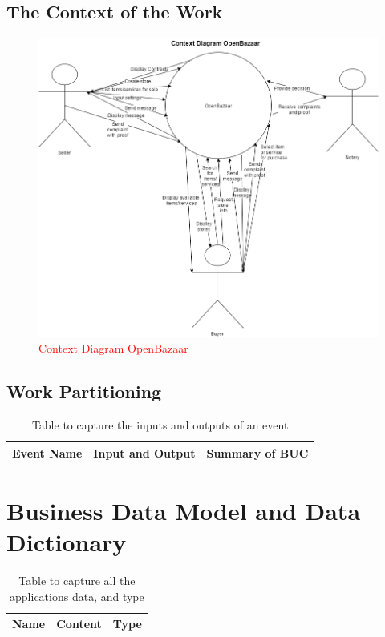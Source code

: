 \documentclass{article}
\begin{document}
\subsection{The Context of the Work}
\begin{figure}[h!]
\includegraphics[scale=0.5]{ContextDiagramOpenBazaar}
\caption{\textcolor{red}{Context Diagram OpenBazaar}}
\end{figure}

\subsection{Work Partitioning}

\begin{table}[h!]
\centering
\begin{tabular}{||c c c ||}
 \hline
 \textbf {Event Name} & \textbf{Input and Output} & \textbf{Summary of BUC} \\ [0.5ex]
 \hline
\end{tabular}
\caption{Table to capture the inputs and outputs of an event}
\label{table:2}
\end{table}

\section{Business Data Model and Data Dictionary}

\begin{table}[h!]
\centering
\begin{tabular}{||c c c ||}
 \hline
 \textbf {Name} & \textbf{Content} & \textbf{Type} \\ [0.5ex]
 \hline
\end{tabular}
\caption{Table to capture all the applications data, and type}
\label{table:3}
\end{table}
\end{document}
